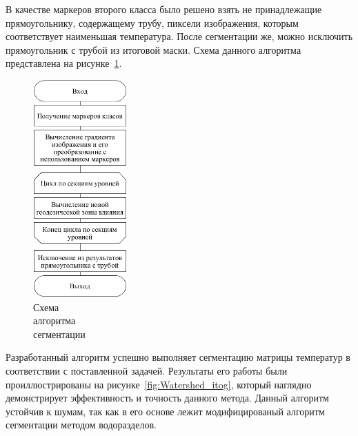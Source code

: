 \documentclass[14pt, a4paper]{extreport}
\begin{document}
	В качестве маркеров второго класса было решено взять не принадлежащие прямоугольнику, содержащему трубу, пиксели изображения, которым соответствует наименьшая температура. После сегментации же, можно исключить прямоугольник с трубой из итоговой маски. Схема данного алгоритма представлена на рисунке~\ref{fig:waterShedSegmentation}.
	
	\begin{figure}[h!]
		\centering
		\includegraphics[width = 0.32\textwidth]{image/chapter_3/waterShedSegmentation}	
		\caption{Схема\\ алгоритма\\ сегментации}
		\vspace*{-0.2cm}
		\label{fig:waterShedSegmentation}
		\vspace*{0.4cm}
	\end{figure}
	
	Разработанный алгоритм успешно выполняет сегментацию матрицы температур в соответствии с поставленной задачей. Результаты его работы были проиллюстрированы на рисунке~\ref{fig:Watershed_itog}, который наглядно демонстрирует эффективность и точность данного метода. Данный алгоритм устойчив к шумам, так как в его основе лежит модифицированый алгоритм сегментации методом водоразделов.
	
\end{document}
